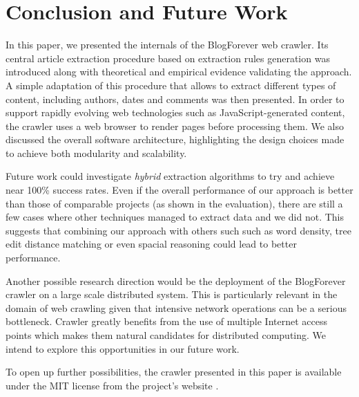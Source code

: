 \section{Conclusion and Future Work}
In this paper, we presented the internals of the BlogForever web crawler. Its central article extraction procedure based on extraction rules generation was introduced along with theoretical and empirical evidence validating the approach. A simple adaptation of this procedure that allows to extract different types of content, including authors, dates and comments was then presented. In order to support rapidly evolving web technologies such as JavaScript-generated content, the crawler uses a web browser to render pages before processing them. We also discussed the overall software architecture, highlighting the design choices made to achieve both modularity and scalability.

Future work could investigate \emph{hybrid} extraction algorithms to try and achieve near 100\% success rates. Even if the overall performance of our approach is better than those of comparable projects (as shown in the evaluation), there are still a few cases where other techniques managed to extract data and we did not. This suggests that combining our approach with others such such as word density, tree edit distance matching or even spacial reasoning could lead to better performance.

Another possible research direction would be the deployment of the BlogForever crawler on a large scale distributed system. This is particularly relevant in the domain of web crawling given that intensive network operations can be a serious bottleneck. Crawler greatly benefits from the use of multiple Internet access points which makes them natural candidates for distributed computing. We intend to explore this opportunities in our future work.

To open up further possibilities, the crawler presented in this paper is available under the MIT license from the project's website \cite{blogforevercrawler}.
